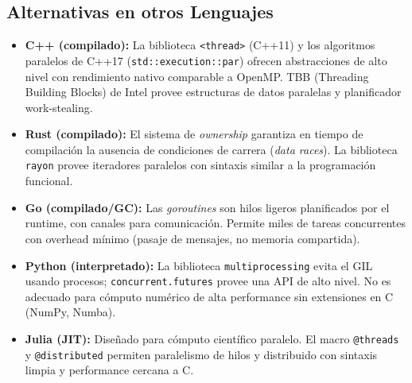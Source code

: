\documentclass[11pt,a4paper]{article}
\begin{document}
\subsection*{Alternativas en otros Lenguajes}
\begin{itemize}
    \item \textbf{C++ (compilado):} La biblioteca \texttt{<thread>} (C++11) y los algoritmos paralelos de C++17 (\texttt{std::execution::par}) ofrecen abstracciones de alto nivel con rendimiento nativo comparable a OpenMP. TBB (Threading Building Blocks) de Intel provee estructuras de datos paralelas y planificador work-stealing.
    \item \textbf{Rust (compilado):} El sistema de \emph{ownership} garantiza en tiempo de compilación la ausencia de condiciones de carrera (\emph{data races}). La biblioteca \texttt{rayon} provee iteradores paralelos con sintaxis similar a la programación funcional.
    \item \textbf{Go (compilado/GC):} Las \emph{goroutines} son hilos ligeros planificados por el runtime, con canales para comunicación. Permite miles de tareas concurrentes con overhead mínimo (pasaje de mensajes, no memoria compartida).
    \item \textbf{Python (interpretado):} La biblioteca \texttt{multiprocessing} evita el GIL usando procesos; \texttt{concurrent.futures} provee una API de alto nivel. No es adecuado para cómputo numérico de alta performance sin extensiones en C (NumPy, Numba).
    \item \textbf{Julia (JIT):} Diseñado para cómputo científico paralelo. El macro \texttt{@threads} y \texttt{@distributed} permiten paralelismo de hilos y distribuido con sintaxis limpia y performance cercana a C.
\end{itemize}
\end{document}
